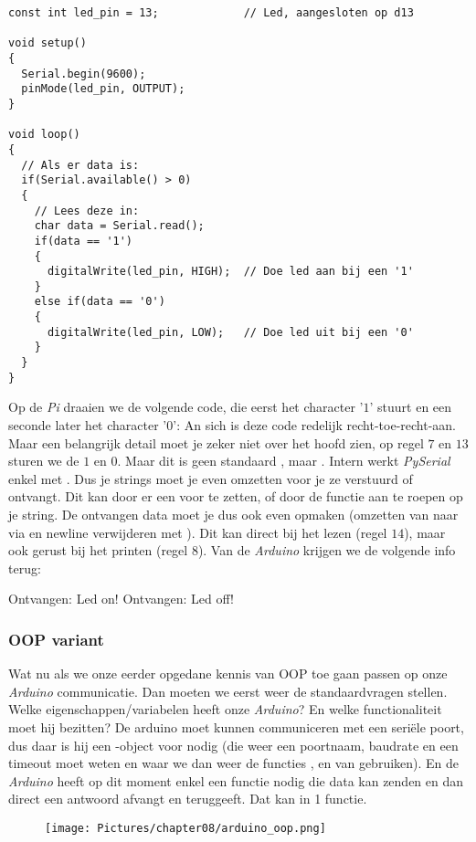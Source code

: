 \newpage 

\begin{lstlisting}[language=Arduino]
const int led_pin = 13;             // Led, aangesloten op d13

void setup() 
{
  Serial.begin(9600);
  pinMode(led_pin, OUTPUT);
}

void loop() 
{
  // Als er data is:
  if(Serial.available() > 0)
  {
    // Lees deze in:
    char data = Serial.read();
    if(data == '1')
    {
      digitalWrite(led_pin, HIGH);  // Doe led aan bij een '1'
    }
    else if(data == '0')
    {
      digitalWrite(led_pin, LOW);   // Doe led uit bij een '0'
    }
  }
}
\end{lstlisting}

Op de \textit{Pi} draaien we de volgende code, die eerst het character '$1$' stuurt en een seconde later het character '$0$':
An sich is deze code redelijk recht-toe-recht-aan. Maar een belangrijk detail moet je zeker niet over het hoofd zien, op regel $7$ en $13$ sturen we de $1$ en $0$. Maar dit is geen standaard , maar . Intern werkt \textit{PySerial} enkel met . Dus je strings moet je even omzetten voor je ze verstuurd of ontvangt. Dit kan door er een  voor te zetten, of door de functie  aan te roepen op je string.\newline
De ontvangen data moet je dus ook even opmaken (omzetten van  naar  via  en newline verwijderen met ). Dit kan direct bij het lezen (regel $14$), maar ook gerust bij het printen (regel $8$). Van de \textit{Arduino} krijgen we de volgende info terug:
\begin{python}
Ontvangen: Led on!
Ontvangen: Led off!
\end{python}

\newpage

\subsubsection{OOP variant}
Wat nu als we onze eerder opgedane kennis van OOP toe gaan passen op onze \textit{Arduino} communicatie. Dan moeten we eerst weer de standaardvragen stellen. Welke eigenschappen/variabelen heeft onze \textit{Arduino}? En welke functionaliteit moet hij bezitten? \newline
De arduino moet kunnen communiceren met een seriële poort, dus daar is hij een -object voor nodig (die weer een poortnaam, baudrate en een timeout moet weten en waar we dan weer de functies ,  en  van gebruiken). En de \textit{Arduino} heeft op dit moment enkel een functie nodig die data kan zenden en dan direct een antwoord afvangt en teruggeeft. Dat kan in 1 functie.
\begin{figure}[h!]
\centering\texttt{[image: Pictures/chapter08/arduino\_oop.png]}
\label{fig:arduino_oop} %
\end{figure}

